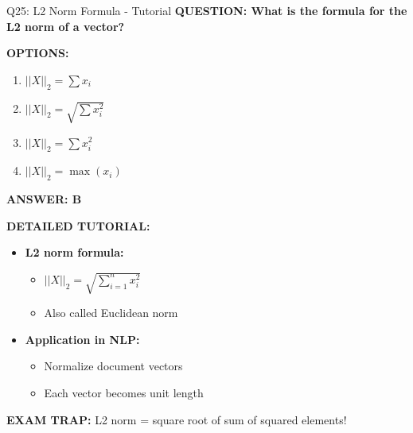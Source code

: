 \documentclass[8pt]{beamer}
\begin{document}
	\begin{frame}{Q25: L2 Norm Formula - Tutorial}
		\fontsize{6.5}{7.5}\selectfont
		\textbf{QUESTION: What is the formula for the L2 norm of a vector?}
		
		\vspace{0.1cm}
		\textbf{OPTIONS:}
		\begin{enumerate}
			\item $||X||_2 = \sum x_i$
			\item $||X||_2 = \sqrt{\sum x_i^2}$
			\item $||X||_2 = \sum x_i^2$
			\item $||X||_2 = \max(x_i)$
		\end{enumerate}
		
		\vspace{0.1cm}
		\textcolor{myblue}{\textbf{ANSWER: B}}
		
		\vspace{0.1cm}
		\textbf{DETAILED TUTORIAL:}
		\begin{itemize}
			\item \textbf{L2 norm formula:}
			\begin{itemize}
				\item $||X||_2 = \sqrt{\sum_{i=1}^n x_i^2}$
				\item Also called Euclidean norm
			\end{itemize}
			\item \textbf{Application in NLP:}
			\begin{itemize}
				\item Normalize document vectors
				\item Each vector becomes unit length
			\end{itemize}
		\end{itemize}
		
		\textcolor{myred}{\textbf{EXAM TRAP:}} L2 norm = \textcolor{myblue}{square root of sum of squared elements}!
	\end{frame}
	
	
\end{document}
